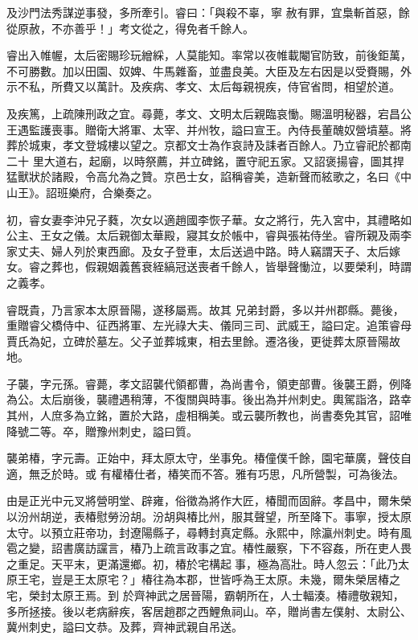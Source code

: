 \begin{pinyinscope}
 及沙門法秀謀逆事發，多所牽引。睿曰：「與殺不辜，寧
 赦有罪，宜梟斬首惡，餘從原赦，不亦善乎！」考文從之，得免者千餘人。



 睿出入帷幄，太后密賜珍玩繒綵，人莫能知。率常以夜帷載閹官防致，前後鉅萬，不可勝數。加以田園、奴婢、牛馬雜畜，並盡良美。大臣及左右因是以受賚賜，外示不私，所費又以萬計。及疾病、孝文、太后每親視疾，侍官省問，相望於道。



 及疾篤，上疏陳刑政之宜。尋薨，孝文、文明太后親臨哀慟。賜溫明秘器，宕昌公王遇監護喪事。贈衛大將軍、太宰、并州牧，謚曰宣王。內侍長董醜奴營墳墓。將葬於城東，孝文登城樓以望之。京都文士為作哀詩及誄者百餘人。乃立睿祀於都南二十
 里大道右，起廟，以時祭薦，并立碑銘，置守祀五家。又詔褒揚睿，圖其捍猛獸狀於諸殿，令高允為之贊。京邑士女，諂稱睿美，造新聲而絃歌之，名曰《中山王》。詔班樂府，合樂奏之。



 初，睿女妻李沖兄子蕤，次女以適趙國李恢子華。女之將行，先入宮中，其禮略如公主、王女之儀。太后親御太華殿，寢其女於帳中，睿與張祐侍坐。睿所親及兩李家丈夫、婦人列於東西廊。及女子登車，太后送過中路。時人竊謂天子、太后嫁女。睿之葬也，假親姻義舊衰絰縞冠送喪者千餘人，皆舉聲慟泣，以要榮利，時謂之義孝。



 睿既貴，乃言家本太原晉陽，遂移屬焉。故其
 兄弟封爵，多以并州郡縣。薨後，重贈睿父橋侍中、征西將軍、左光祿大夫、儀同三司、武威王，謚曰定。追策睿母賈氏為妃，立碑於墓左。父子並葬城東，相去里餘。遷洛後，更徙葬太原晉陽故地。



 子襲，字元孫。睿薨，孝文詔襲代領都曹，為尚書令，領吏部曹。後襲王爵，例降為公。太后崩後，襲禮遇稍薄，不復關與時事。後出為并州刺史。輿駕詣洛，路幸其州，人庶多為立銘，置於大路，虛相稱美。或云襲所教也，尚書奏免其官，詔唯降號二等。卒，贈豫州刺史，謚曰質。



 襲弟椿，字元壽。正始中，拜太原太守，坐事免。椿僮僕千餘，園宅華廣，聲伎自適，無乏於時。或
 有權椿仕者，椿笑而不答。雅有巧思，凡所營製，可為後法。



 由是正光中元叉將營明堂、辟雍，俗徵為將作大匠，椿聞而固辭。孝昌中，爾朱榮以汾州胡逆，表椿慰勞汾胡。汾胡與椿比州，服其聲望，所至降下。事寧，授太原太守。以預立莊帝功，封遼陽縣子，尋轉封真定縣。永熙中，除瀛州刺史。時有風雹之變，詔書廣訪讜言，椿乃上疏言政事之宜。椿性嚴察，下不容姦，所在吏人畏之重足。天平末，更滿還鄉。初，椿於宅構起事，極為高壯。時人忽云：「此乃太原王宅，豈是王太原宅？」椿往為本郡，世皆呼為王太原。未幾，爾朱榮居椿之宅，榮封太原王焉。到
 於齊神武之居晉陽，霸朝所在，人士輻湊。椿禮敬親知，多所拯接。後以老病辭疾，客居趙郡之西鯉魚祠山。卒，贈尚書左僕射、太尉公、冀州刺史，謚曰文恭。及葬，齊神武親自吊送。




\end{pinyinscope}
